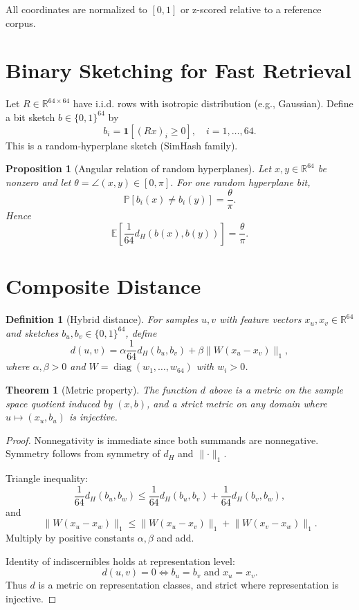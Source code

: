 \documentclass[11pt,a4paper]{article}
\newtheorem{definition}{Definition}
\newtheorem{theorem}{Theorem}
\newtheorem{proposition}{Proposition}
\DeclareMathOperator{\diag}{diag}
\begin{document}
All coordinates are normalized to $[0,1]$ or z-scored relative to a reference corpus.

\section{Binary Sketching for Fast Retrieval}
Let $R \in \mathbb{R}^{64 \times 64}$ have i.i.d. rows with isotropic distribution (e.g., Gaussian). Define a bit sketch $b \in \{0,1\}^{64}$ by
\[
b_i = \mathbf{1}\!\left[(Rx)_i \ge 0\right], \quad i=1,\dots,64.
\]
This is a random-hyperplane sketch (SimHash family).

\begin{proposition}[Angular relation of random hyperplanes]
Let $x,y \in \mathbb{R}^{64}$ be nonzero and let $\theta = \angle(x,y) \in [0,\pi]$. For one random hyperplane bit,
\[
\mathbb{P}[b_i(x) \ne b_i(y)] = \frac{\theta}{\pi}.
\]
Hence
\[
\mathbb{E}\!\left[\frac{1}{64}d_H(b(x),b(y))\right] = \frac{\theta}{\pi}.
\]
\end{proposition}

\section{Composite Distance}
\begin{definition}[Hybrid distance]
For samples $u,v$ with feature vectors $x_u,x_v \in \mathbb{R}^{64}$ and sketches $b_u,b_v \in \{0,1\}^{64}$, define
\[
d(u,v) = \alpha \frac{1}{64} d_H(b_u,b_v) + \beta \lVert W(x_u - x_v)\rVert_1,
\]
where $\alpha,\beta > 0$ and $W=\diag(w_1,\dots,w_{64})$ with $w_i>0$.
\end{definition}

\begin{theorem}[Metric property]
The function $d$ above is a metric on the sample space quotient induced by $(x,b)$, and a strict metric on any domain where $u \mapsto (x_u,b_u)$ is injective.
\end{theorem}

\begin{proof}
Nonnegativity is immediate since both summands are nonnegative. Symmetry follows from symmetry of $d_H$ and $\lVert\cdot\rVert_1$.

Triangle inequality:
\[
\frac{1}{64}d_H(b_u,b_w) \le \frac{1}{64}d_H(b_u,b_v) + \frac{1}{64}d_H(b_v,b_w),
\]
and
\[
\lVert W(x_u-x_w)\rVert_1 \le \lVert W(x_u-x_v)\rVert_1 + \lVert W(x_v-x_w)\rVert_1.
\]
Multiply by positive constants $\alpha,\beta$ and add.

Identity of indiscernibles holds at representation level:
\[
d(u,v)=0 \iff b_u=b_v \text{ and } x_u=x_v.
\]
Thus $d$ is a metric on representation classes, and strict where representation is injective.
\end{proof}
\end{document}

